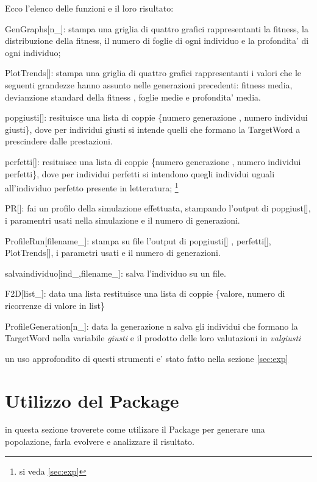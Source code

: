 \documentclass[12pt, a4paper]{article}
\begin{document}
Ecco l'elenco delle funzioni e il loro risultato:
\begin{description}
\item{GenGraphs[n\_]: } stampa una griglia di quattro grafici rappresentanti la fitness, la distribuzione della fitness, il numero di foglie di ogni individuo e la profondita' di ogni individuo;
\item{PlotTrends[]: } stampa una griglia di quattro grafici rappresentanti i valori che le seguenti grandezze hanno assunto nelle generazioni precedenti: fitness media, devianzione standard della fitness , foglie medie e profondita' media.
\item{popgiusti[]: } resituisce una lista di coppie \{numero generazione , numero individui giusti\}, dove per individui giusti si intende quelli che formano la TargetWord a prescindere dalle prestazioni.
\item{perfetti[]: } resituisce una lista di coppie \{numero generazione , numero individui perfetti\}, dove per individui perfetti si intendono quegli individui uguali all'individuo perfetto presente in letteratura;
\footnote{si veda \ref{sec:exp}}
\item{PR[]: } fai un profilo della simulazione effettuata, stampando l'output di popgiust[], i paramentri usati nella simulazione e il numero di generazioni.
\item{ProfileRun[filename\_]: } stampa su file l'output di popgiusti[] , perfetti[], PlotTrends[], i parametri usati e il numero di generazioni.
\item{salvaindividuo[ind\_,filename\_]: } salva l'individuo su un file.
\item{F2D[list\_]: } data una lista restituisce una lista di coppie \{valore, numero di ricorrenze di valore in list\}
\item{ProfileGeneration[n\_]: } data la generazione n salva gli individui che formano la TargetWord nella variabile {\itshape giusti} e il prodotto delle loro valutazioni in {\itshape valgiusti}
\end{description}

un uso approfondito di questi strumenti e' stato fatto nella sezione \ref{sec:exp}

\section{Utilizzo del Package}
in questa sezione troverete come utilizare il Package per generare una popolazione, farla evolvere e analizzare il risultato.
\end{document}
